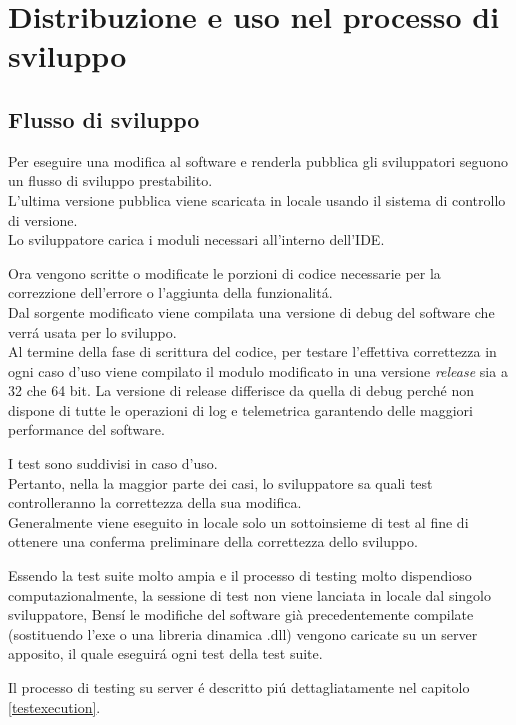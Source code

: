 \chapter{Distribuzione e uso nel processo di sviluppo}
    \section{Flusso di sviluppo}
        Per eseguire una modifica al software e renderla pubblica gli sviluppatori seguono un flusso di sviluppo prestabilito.\\
        L'ultima versione pubblica viene scaricata in locale usando il sistema di controllo di versione.\\
        Lo sviluppatore carica i moduli necessari all'interno dell'IDE.

        Ora vengono scritte o modificate le porzioni di codice necessarie per la correzzione dell'errore o l'aggiunta della funzionalit\'a.\\
        Dal sorgente modificato viene compilata una versione di debug del software che verr\'a usata per lo sviluppo.\\
        Al termine della fase di scrittura del codice, per testare l'effettiva correttezza in ogni caso d'uso viene compilato il modulo modificato in una versione \textit{release} sia a 32 che 64 bit.
        La versione di release differisce da quella di debug perch\'e non dispone di tutte le operazioni di log e telemetrica garantendo delle maggiori performance del software.
        
        I test sono suddivisi in caso d'uso.\\
        Pertanto, nella la maggior parte dei casi, lo sviluppatore sa quali test  controlleranno la correttezza della sua modifica.\\
        Generalmente viene eseguito in locale solo un sottoinsieme di test al fine di ottenere una conferma preliminare della correttezza dello sviluppo.

        Essendo la test suite molto ampia e il processo di testing molto dispendioso computazionalmente, 
        la sessione di test non viene lanciata in locale dal singolo sviluppatore, 
        Bens\'i  le modifiche del software già precedentemente compilate (sostituendo l’exe o una libreria dinamica .dll) 
        vengono caricate su un server apposito, il quale eseguir\'a ogni test della test suite.

        Il processo di testing su server \'e descritto pi\'u dettagliatamente nel capitolo \ref{testexecution}.
        
